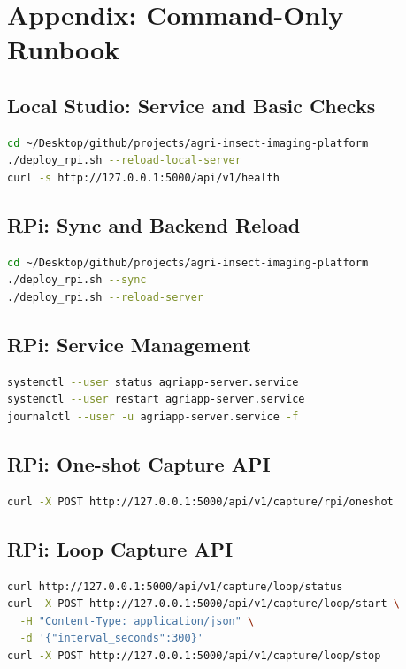 \section{Appendix: Command-Only Runbook}

\subsection{Local Studio: Service and Basic Checks}
\begin{lstlisting}[language=bash]
cd ~/Desktop/github/projects/agri-insect-imaging-platform
./deploy_rpi.sh --reload-local-server
curl -s http://127.0.0.1:5000/api/v1/health
\end{lstlisting}

\subsection{RPi: Sync and Backend Reload}
\begin{lstlisting}[language=bash]
cd ~/Desktop/github/projects/agri-insect-imaging-platform
./deploy_rpi.sh --sync
./deploy_rpi.sh --reload-server
\end{lstlisting}

\subsection{RPi: Service Management}
\begin{lstlisting}[language=bash]
systemctl --user status agriapp-server.service
systemctl --user restart agriapp-server.service
journalctl --user -u agriapp-server.service -f
\end{lstlisting}

\subsection{RPi: One-shot Capture API}
\begin{lstlisting}[language=bash]
curl -X POST http://127.0.0.1:5000/api/v1/capture/rpi/oneshot
\end{lstlisting}

\subsection{RPi: Loop Capture API}
\begin{lstlisting}[language=bash]
curl http://127.0.0.1:5000/api/v1/capture/loop/status
curl -X POST http://127.0.0.1:5000/api/v1/capture/loop/start \
  -H "Content-Type: application/json" \
  -d '{"interval_seconds":300}'
curl -X POST http://127.0.0.1:5000/api/v1/capture/loop/stop
\end{lstlisting}

